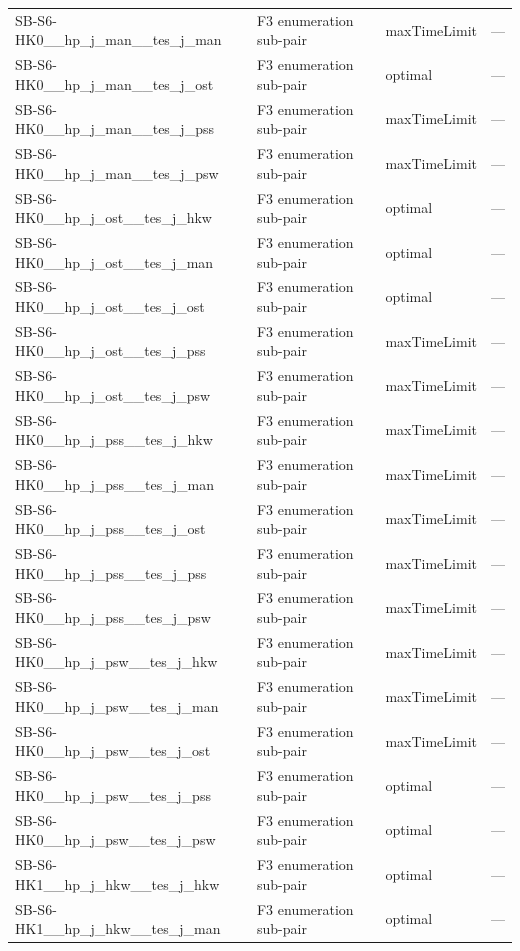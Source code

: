 \begin{table}[htbp]
\begin{tabular}{lllr}
  SB-S6-HK0\_\_hp\_j\_man\_\_tes\_j\_man & F3 enumeration sub-pair & maxTimeLimit & — \\
  SB-S6-HK0\_\_hp\_j\_man\_\_tes\_j\_ost & F3 enumeration sub-pair & optimal & — \\
  SB-S6-HK0\_\_hp\_j\_man\_\_tes\_j\_pss & F3 enumeration sub-pair & maxTimeLimit & — \\
  SB-S6-HK0\_\_hp\_j\_man\_\_tes\_j\_psw & F3 enumeration sub-pair & maxTimeLimit & — \\
  SB-S6-HK0\_\_hp\_j\_ost\_\_tes\_j\_hkw & F3 enumeration sub-pair & optimal & — \\
  SB-S6-HK0\_\_hp\_j\_ost\_\_tes\_j\_man & F3 enumeration sub-pair & optimal & — \\
  SB-S6-HK0\_\_hp\_j\_ost\_\_tes\_j\_ost & F3 enumeration sub-pair & optimal & — \\
  SB-S6-HK0\_\_hp\_j\_ost\_\_tes\_j\_pss & F3 enumeration sub-pair & maxTimeLimit & — \\
  SB-S6-HK0\_\_hp\_j\_ost\_\_tes\_j\_psw & F3 enumeration sub-pair & maxTimeLimit & — \\
  SB-S6-HK0\_\_hp\_j\_pss\_\_tes\_j\_hkw & F3 enumeration sub-pair & maxTimeLimit & — \\
  SB-S6-HK0\_\_hp\_j\_pss\_\_tes\_j\_man & F3 enumeration sub-pair & maxTimeLimit & — \\
  SB-S6-HK0\_\_hp\_j\_pss\_\_tes\_j\_ost & F3 enumeration sub-pair & maxTimeLimit & — \\
  SB-S6-HK0\_\_hp\_j\_pss\_\_tes\_j\_pss & F3 enumeration sub-pair & maxTimeLimit & — \\
  SB-S6-HK0\_\_hp\_j\_pss\_\_tes\_j\_psw & F3 enumeration sub-pair & maxTimeLimit & — \\
  SB-S6-HK0\_\_hp\_j\_psw\_\_tes\_j\_hkw & F3 enumeration sub-pair & maxTimeLimit & — \\
  SB-S6-HK0\_\_hp\_j\_psw\_\_tes\_j\_man & F3 enumeration sub-pair & maxTimeLimit & — \\
  SB-S6-HK0\_\_hp\_j\_psw\_\_tes\_j\_ost & F3 enumeration sub-pair & maxTimeLimit & — \\
  SB-S6-HK0\_\_hp\_j\_psw\_\_tes\_j\_pss & F3 enumeration sub-pair & optimal & — \\
  SB-S6-HK0\_\_hp\_j\_psw\_\_tes\_j\_psw & F3 enumeration sub-pair & optimal & — \\
  SB-S6-HK1\_\_hp\_j\_hkw\_\_tes\_j\_hkw & F3 enumeration sub-pair & optimal & — \\
  SB-S6-HK1\_\_hp\_j\_hkw\_\_tes\_j\_man & F3 enumeration sub-pair & optimal & — \\

\end{tabular}
\end{table}
